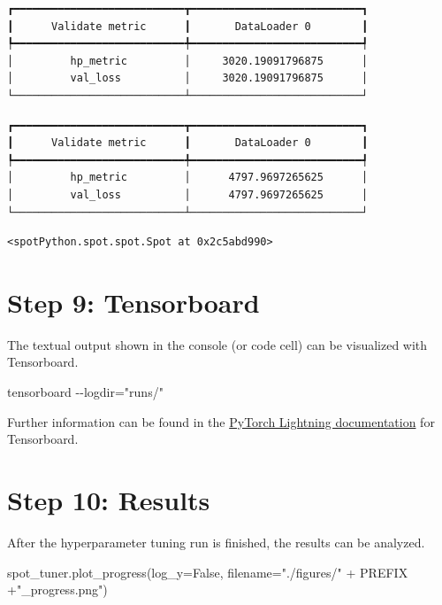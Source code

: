 \documentclass[
  letterpaper,
  DIV=11,
  numbers=noendperiod]{scrreprt}
\newenvironment{Shaded}{\begin{snugshade}}{\end{snugshade}}
\newcommand{\NormalTok}[1]{\textcolor[rgb]{0.00,0.23,0.31}{#1}}
\newcommand{\OperatorTok}[1]{\textcolor[rgb]{0.37,0.37,0.37}{#1}}
\newcommand{\StringTok}[1]{\textcolor[rgb]{0.13,0.47,0.30}{#1}}
\newcommand{\VariableTok}[1]{\textcolor[rgb]{0.07,0.07,0.07}{#1}}
\begin{document}
\begin{verbatim}
┏━━━━━━━━━━━━━━━━━━━━━━━━━━━┳━━━━━━━━━━━━━━━━━━━━━━━━━━━┓
┃      Validate metric      ┃       DataLoader 0        ┃
┡━━━━━━━━━━━━━━━━━━━━━━━━━━━╇━━━━━━━━━━━━━━━━━━━━━━━━━━━┩
│         hp_metric         │     3020.19091796875      │
│         val_loss          │     3020.19091796875      │
└───────────────────────────┴───────────────────────────┘
\end{verbatim}

\begin{verbatim}
┏━━━━━━━━━━━━━━━━━━━━━━━━━━━┳━━━━━━━━━━━━━━━━━━━━━━━━━━━┓
┃      Validate metric      ┃       DataLoader 0        ┃
┡━━━━━━━━━━━━━━━━━━━━━━━━━━━╇━━━━━━━━━━━━━━━━━━━━━━━━━━━┩
│         hp_metric         │      4797.9697265625      │
│         val_loss          │      4797.9697265625      │
└───────────────────────────┴───────────────────────────┘
\end{verbatim}

\begin{verbatim}
<spotPython.spot.spot.Spot at 0x2c5abd990>
\end{verbatim}

\section{Step 9: Tensorboard}\label{sec-tensorboard-31}

The textual output shown in the console (or code cell) can be visualized
with Tensorboard.

\begin{Shaded}
\begin{Highlighting}[]
\NormalTok{tensorboard {-}{-}logdir="runs/"}
\end{Highlighting}
\end{Shaded}

Further information can be found in the
\href{https://lightning.ai/docs/pytorch/stable/api/lightning.pytorch.loggers.tensorboard.html}{PyTorch
Lightning documentation} for Tensorboard.

\section{Step 10: Results}\label{sec-results-31}

After the hyperparameter tuning run is finished, the results can be
analyzed.

\begin{Shaded}
\begin{Highlighting}[]
\NormalTok{spot\_tuner.plot\_progress(log\_y}\OperatorTok{=}\VariableTok{False}\NormalTok{,}
\NormalTok{    filename}\OperatorTok{=}\StringTok{"./figures/"} \OperatorTok{+}\NormalTok{ PREFIX }\OperatorTok{+}\StringTok{"\_progress.png"}\NormalTok{)}
\end{Highlighting}
\end{Shaded}
\end{document}
